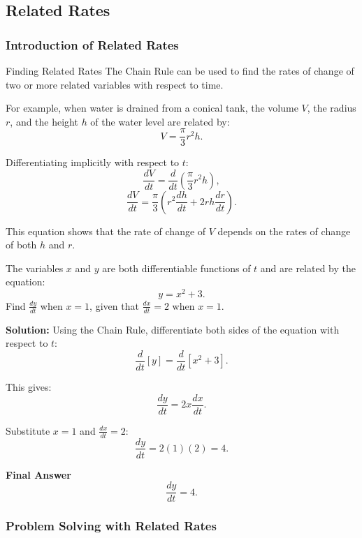 \documentclass[12pt]{article}
\theoremstyle{beautifulthm}
\begin{document}
\subsection{Related Rates}
\subsubsection{Introduction of Related Rates}
\begin{Note}{Finding Related Rates }{}
The Chain Rule can be used to find the rates of change of two or more related variables with respect to time.
\tcblower

For example, when water is drained from a conical tank, the volume \( V \), the radius \( r \), and the height \( h \) of the water level are related by:
\[
V = \frac{\pi}{3}r^2h.
\]

Differentiating implicitly with respect to \( t \):
\[
\frac{dV}{dt} = \frac{d}{dt} \left( \frac{\pi}{3}r^2h \right),
\]
\[
\frac{dV}{dt} = \frac{\pi}{3} \left( r^2 \frac{dh}{dt} + 2r h \frac{dr}{dt} \right).
\]

This equation shows that the rate of change of \( V \) depends on the rates of change of both \( h \) and \( r \).

\end{Note}

\begin{tcolorbox}[colback=examplebg, colframe=red!75!black, title=\textbf{EXAMPLE 1:Two Rates That Are Related}, fonttitle=\bfseries, sharp corners]
The variables \( x \) and \( y \) are both differentiable functions of \( t \) and are related by the equation:
\[
y = x^2 + 3.
\]
Find \( \frac{dy}{dt} \) when \( x = 1 \), given that \( \frac{dx}{dt} = 2 \) when \( x = 1 \).

\tcblower
\textbf{Solution:}  
Using the Chain Rule, differentiate both sides of the equation with respect to \( t \):
\[
\frac{d}{dt}[y] = \frac{d}{dt}[x^2 + 3].
\]

This gives:
\[
\frac{dy}{dt} = 2x \frac{dx}{dt}.
\]

Substitute \( x = 1 \) and \( \frac{dx}{dt} = 2 \):
\[
\frac{dy}{dt} = 2(1)(2) = 4.
\]

\textbf*{Final Answer}
\[
\frac{dy}{dt} = 4.
\]
\end{tcolorbox}



\subsubsection{Problem Solving with Related Rates}
\end{document}
